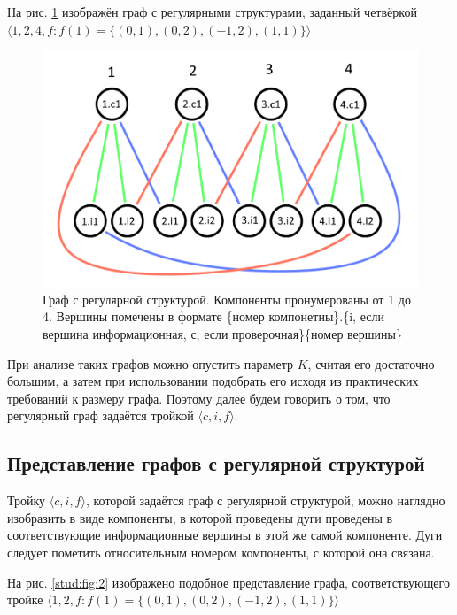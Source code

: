 \documentclass[14pt]{mmcs_article}
\begin{document}
На рис. \ref{stud:fig:1} изображён граф с регулярными структурами, заданный четвёркой $\langle 1, 2, 4, f: f(1) = \{ (0, 1), (0, 2), (-1, 2), (1, 1) \} \rangle$

\begin{figure}[H]
  \centering
  \includegraphics[scale=0.4]{Fig_1.png}
  \caption{ Граф с регулярной структурой. Компоненты пронумерованы от 1 до 4. Вершины помечены в формате \{номер компонетны\}.\{i, если вершина информационная, с, если проверочная\}\{номер вершины\} }\label{stud:fig:1}
\end{figure}

При анализе таких графов можно опустить параметр $K$, считая его достаточно большим, а затем при использовании подобрать его исходя из практических требований к размеру графа. Поэтому далее будем говорить о том, что регулярный граф задаётся тройкой $\langle c, i, f \rangle$.

\subsection{Представление графов с регулярной структурой}

Тройку $\langle c, i, f \rangle$, которой задаётся граф с регулярной структурой, можно наглядно изобразить в виде компоненты, в которой проведены дуги проведены в соответствующие информационные вершины в этой же самой компоненте. Дуги следует пометить относительным номером компоненты, с которой она связана.

На рис. \ref{stud:fig:2} изображено подобное представление графа, соответствующего тройке $\langle 1, 2, f: f(1) = \{ (0, 1), (0, 2), (-1, 2), (1, 1) \} \rangle$
\end{document}
